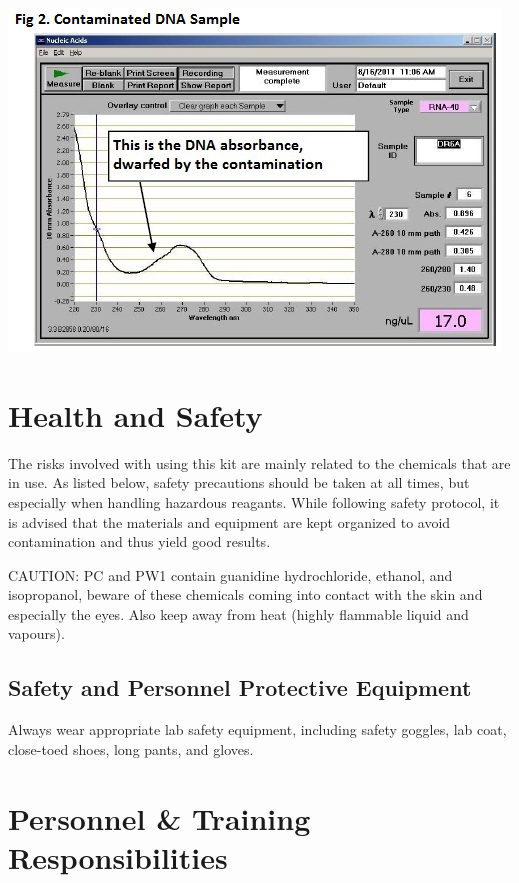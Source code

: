 \documentclass[12pt]{../SOP3_alpha}\usepackage[]{graphicx}\usepackage[]{color}
\begin{document}
\begin{description}
\includegraphics[scale=1]{NanoDropContaminated.png}

\end{description}

\section{Health and Safety}

\NP The risks involved with using this kit are mainly related to the chemicals that are in use. As listed below, safety precautions should be taken at all times, but especially when handling hazardous reagants. While following safety protocol, it is advised that the materials and equipment are kept organized to avoid contamination and thus yield good results. 

\NP CAUTION: PC and PW1 contain guanidine hydrochloride, ethanol, and isopropanol, beware of these chemicals coming into contact with the skin and especially the eyes. Also keep away from heat (highly flammable liquid and vapours).

\subsection{Safety and Personnel Protective Equipment}

\NP Always wear appropriate lab safety equipment, including safety goggles, lab coat, close-toed shoes, long pants, and gloves. 

\section{Personnel \& Training Responsibilities}
\end{document}
